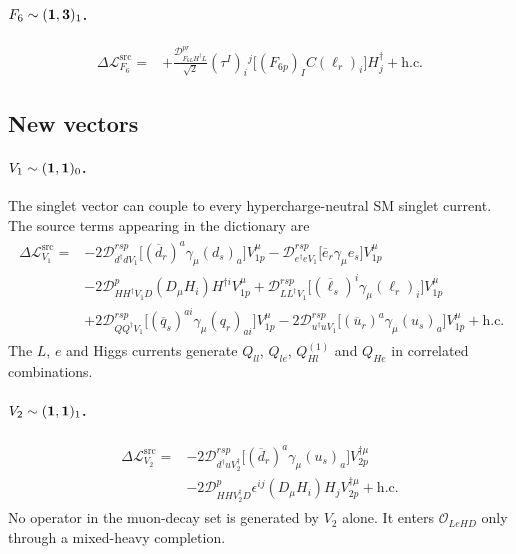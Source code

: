 \paragraph{$F_6\sim({\bf1},{\bf3})_1$.}
\begin{align}
    \Delta\mathcal L_{F_6}^{\mathrm{src}}
    ={}&+\frac{\mathcal D_{F_{6L}H^\dagger L}^{pr}}{\sqrt2}
       (\tau^I)_i{}^j
       \big[(F_{6p})_I C(\ell_r)_i\big]H_j^\dagger
       +\mathrm{h.c.}
    \label{eq:uv-lag-F6}
\end{align}

\subsection{New vectors}

\paragraph{$V_1\sim({\bf1},{\bf1})_0$.}
The singlet vector can couple to every hypercharge-neutral SM singlet current.
The source terms appearing in the dictionary are
\begin{align}
\begin{split}
    \Delta\mathcal L_{V_1}^{\mathrm{src}}={}&
       -2\mathcal D_{d^\dagger dV_1}^{rsp}
        \big[(\overline d_r)^a\gamma_\mu(d_s)_a\big]V_{1p}^\mu
       -\mathcal D_{e^\dagger eV_1}^{rsp}
        \big[\overline e_r\gamma_\mu e_s\big]V_{1p}^\mu
        \\
      &-2\mathcal D_{HH^\dagger V_1D}^{p}
        (D_\mu H_i)H^{\dagger i}V_{1p}^\mu
       +\mathcal D_{LL^\dagger V_1}^{rsp}
        \big[(\overline\ell_s)^i\gamma_\mu(\ell_r)_i\big]V_{1p}^\mu
        \\
      &+2\mathcal D_{QQ^\dagger V_1}^{rsp}
        \big[(\overline q_s)^{ai}\gamma_\mu(q_r)_{ai}\big]V_{1p}^\mu
       -2\mathcal D_{u^\dagger uV_1}^{rsp}
        \big[(\overline u_r)^a\gamma_\mu(u_s)_a\big]V_{1p}^\mu
       +\mathrm{h.c.}
\end{split}
\label{eq:uv-lag-V1}
\end{align}
The $L$, $e$ and Higgs currents generate $Q_{ll}$, $Q_{le}$,
$Q_{Hl}^{(1)}$ and $Q_{He}$ in correlated combinations.

\paragraph{$V_2\sim({\bf1},{\bf1})_1$.}
\begin{align}
\begin{split}
    \Delta\mathcal L_{V_2}^{\mathrm{src}}={}&
       -2\mathcal D_{d^\dagger uV_2^\dagger}^{rsp}
       \big[(\overline d_r)^a\gamma_\mu(u_s)_a\big]V_{2p}^{\dagger\mu}
       \\
      &-2\mathcal D_{HHV_2^\dagger D}^{p}\epsilon^{ij}
       (D_\mu H_i)H_jV_{2p}^{\dagger\mu}+\mathrm{h.c.}
\end{split}
\label{eq:uv-lag-V2}
\end{align}
No operator in the muon-decay set is generated by $V_2$ alone.  It enters
$\mathcal O_{LeHD}$ only through a mixed-heavy completion.

